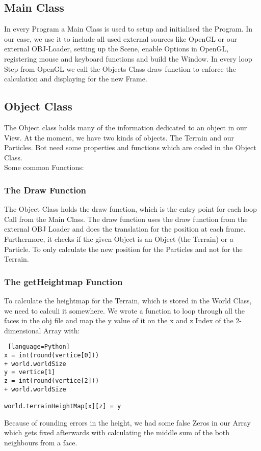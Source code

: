 \documentclass{sig-alternate-05-2015}
\begin{document}
\subsection{Main Class}
In every Program a Main Class is used to setup and initialised the Program. In our case, we use it to include all used external sources like OpenGL or our external OBJ-Loader, setting up the Scene, enable Options in OpenGL, registering mouse and keyboard functions and build the Window. In every loop Step from OpenGL we call the Objects Class draw function to enforce the calculation and displaying for the new Frame.
\subsection{Object Class}
The Object class holds many of the information dedicated to an object in our View. At the moment, we have two kinds of objects. The Terrain and our Particles. Bot need some properties and functions which are coded in the Object Class. \\
Some common Functions:\\
\subsubsection{The Draw Function}
The Object Class holds the draw function, which is the entry point for each loop Call from the Main Class. The draw function uses the draw function from the external OBJ Loader and does the translation for the position at each frame. Furthermore, it checks if the given Object is an Object (the Terrain) or a Particle. To only calculate the new position for the Particles and not for the Terrain.  \\
\subsubsection{The getHeightmap Function}
To calculate the heightmap for the Terrain, which is stored in the World Class, we need to calculi it somewhere. We wrote a function to loop through all the faces in the obj file and map the y value of it on the x and z Index of the 2-dimensional Array with:\\
\begin{lstlisting} [language=Python]
x = int(round(vertice[0])) 
+ world.worldSize
y = vertice[1]
z = int(round(vertice[2])) 
+ world.worldSize

world.terrainHeightMap[x][z] = y

\end{lstlisting}
Because of rounding errors in the height, we had some false Zeros in our Array which gets fixed afterwards with calculating the middle sum of the both neighbours from a face.\\
\end{document}
